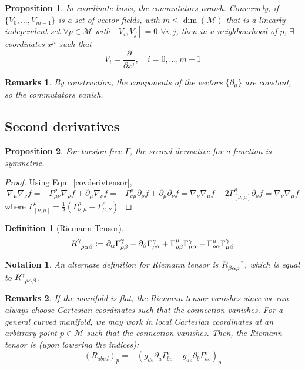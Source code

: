 \documentclass[a4paper]{article}
\newtheorem{remarks}{Remarks}[section]
\newtheorem{notation}{Notation}[section]
\theoremstyle{new}
\newtheorem{defi}{Definition}[section]
\newtheorem{prop}{Proposition}[section]
\begin{document}
\begin{prop}
In coordinate basis, the commutators vanish. Conversely, if $\{V_0,\dots ,V_{m-1}\}$ is a set of vector fields, with $m\leq\dim(\mathcal{M})$ that is a linearly independent set $\forall p\in\mathcal{M}$ with $[V_i,V_j]=0$ $\forall i,j$, then in a neighbourhood of $p$, $\exists$ coordinates $x^\mu$ such that
$$V_i=\frac{\partial}{\partial x^i},\quad i=0,\dots,m-1$$
\end{prop}
\begin{remarks}
By construction, the components of the vectors $\{\partial_\mu\}$ are constant, so the commutators vanish.
\end{remarks}
\newpage
\subsection{Second derivatives}
\begin{prop}
For torsion-free $\Gamma$, the second derivative for a function is symmetric. 
\end{prop}
\begin{proof}
Using Eqn.~\ref{covderivtensor},
$$\nabla_\mu\nabla_\nu f=-\Gamma_{\mu\nu}^\rho\nabla_\rho f+\partial_\mu\nabla_\nu f=-\Gamma_{\nu\mu}^\rho\partial_\rho f+\partial_\mu\partial_\nu f=\nabla_\nu\nabla_\mu f-2\Gamma_{[\nu,\mu]}^\rho\partial_\rho f=\nabla_\nu\nabla_\mu f$$
where $\Gamma_{[\nu,\mu]}^\rho=\frac{1}{2}(\Gamma^\rho_{\nu,\mu}-\Gamma^\rho_{\mu,\nu})$.
\end{proof}
\begin{defi}[Riemann Tensor]
\begin{equation}
\tensor*{R}{*_{}^{\gamma}_{\rho\alpha\beta}}:=\partial_\alpha\Gamma_{\rho\beta}^\gamma-\partial_\beta\Gamma_{\rho\alpha}^\gamma+\Gamma_{\rho\beta}^\mu\Gamma_{\mu\alpha}^\gamma-\Gamma_{\rho\alpha}^\mu\Gamma_{\mu\beta}^\gamma\label{Riemann1}
\end{equation}
\end{defi}
\begin{notation}
An alternate definition for Riemann tensor is $\tensor*{R}{*^{}_{\beta\alpha\rho}^{\gamma}}$, which is equal to $\tensor*{R}{*_{}^{\gamma}_{\rho\alpha\beta}}$.
\end{notation}
\begin{remarks}
If the manifold is flat, the Riemann tensor vanishes since we can always choose Cartesian coordinates such that the connection vanishes. For a general curved manifold, we may work in local Cartesian coordinates at an arbitrary point $p\in\mathcal{M}$ such that the connection vanishes. Then, the Riemann tensor is (upon lowering the indices):
\begin{equation}
(R_{abcd})_p=-(g_{de}\partial_a\Gamma^e_{bc}-g_{de}\partial_b\Gamma^e_{ac})_p\label{localRiemann}
\end{equation}
\end{remarks}
\end{document}

